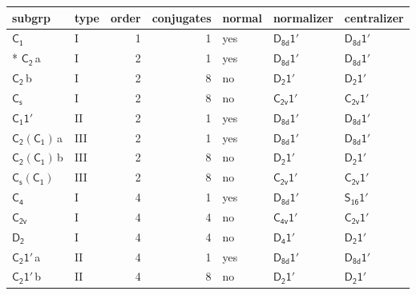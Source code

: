 \documentclass[10pt,a4paper]{article}
\numberwithin{equation}{section}
\newcommand{\grp}[1]{\mathsf{#1}}
\newcommand{\clsletter}[1]{\,{\scriptsize\color{black!55}#1}}
\begin{document}
{\small\begin{longtable}{@{}llrrlll@{}}\toprule
subgrp & type & order & conjugates & normal & normalizer & centralizer\\\midrule\endhead
\bottomrule\endfoot\endlastfoot
\href{../../../rotation/data/pdf/C1.pdf}{$\grp{C_{1}}$} & I & 1 & 1 & yes & \href{D8d-1p.pdf}{$\grp{D_{8d}1'}$} & \href{D8d-1p.pdf}{$\grp{D_{8d}1'}$}\\*
\href{../../../rotation/data/pdf/C2.pdf}{$\grp{C_{2}}$}\clsletter{a} & I & 2 & 1 & yes & \href{D8d-1p.pdf}{$\grp{D_{8d}1'}$} & \href{D8d-1p.pdf}{$\grp{D_{8d}1'}$}\\
\href{../../../rotation/data/pdf/C2.pdf}{$\grp{C_{2}}$}\clsletter{b} & I & 2 & 8 & no & \href{D2-1p.pdf}{$\grp{D_{2}1'}$} & \href{D2-1p.pdf}{$\grp{D_{2}1'}$}\\
\href{../../../rotation/data/pdf/C1v.pdf}{$\grp{C_{s}}$} & I & 2 & 8 & no & \href{C2v-1p.pdf}{$\grp{C_{2v}1'}$} & \href{C2v-1p.pdf}{$\grp{C_{2v}1'}$}\\
\href{C1-1p.pdf}{$\grp{C_{1}1'}$} & II & 2 & 1 & yes & \href{D8d-1p.pdf}{$\grp{D_{8d}1'}$} & \href{D8d-1p.pdf}{$\grp{D_{8d}1'}$}\\
\href{C2-C1.pdf}{$\grp{C_{2}}(\grp{C_{1}})$}\clsletter{a} & III & 2 & 1 & yes & \href{D8d-1p.pdf}{$\grp{D_{8d}1'}$} & \href{D8d-1p.pdf}{$\grp{D_{8d}1'}$}\\
\href{C2-C1.pdf}{$\grp{C_{2}}(\grp{C_{1}})$}\clsletter{b} & III & 2 & 8 & no & \href{D2-1p.pdf}{$\grp{D_{2}1'}$} & \href{D2-1p.pdf}{$\grp{D_{2}1'}$}\\
\href{C1v-C1.pdf}{$\grp{C_{s}}(\grp{C_{1}})$} & III & 2 & 8 & no & \href{C2v-1p.pdf}{$\grp{C_{2v}1'}$} & \href{C2v-1p.pdf}{$\grp{C_{2v}1'}$}\\
\href{../../../rotation/data/pdf/C4.pdf}{$\grp{C_{4}}$} & I & 4 & 1 & yes & \href{D8d-1p.pdf}{$\grp{D_{8d}1'}$} & \href{S16-1p.pdf}{$\grp{S_{16}1'}$}\\
\href{../../../rotation/data/pdf/C2v.pdf}{$\grp{C_{2v}}$} & I & 4 & 4 & no & \href{C4v-1p.pdf}{$\grp{C_{4v}1'}$} & \href{C2v-1p.pdf}{$\grp{C_{2v}1'}$}\\
\href{../../../rotation/data/pdf/D2.pdf}{$\grp{D_{2}}$} & I & 4 & 4 & no & \href{D4-1p.pdf}{$\grp{D_{4}1'}$} & \href{D2-1p.pdf}{$\grp{D_{2}1'}$}\\
\href{C2-1p.pdf}{$\grp{C_{2}1'}$}\clsletter{a} & II & 4 & 1 & yes & \href{D8d-1p.pdf}{$\grp{D_{8d}1'}$} & \href{D8d-1p.pdf}{$\grp{D_{8d}1'}$}\\
\href{C2-1p.pdf}{$\grp{C_{2}1'}$}\clsletter{b} & II & 4 & 8 & no & \href{D2-1p.pdf}{$\grp{D_{2}1'}$} & \href{D2-1p.pdf}{$\grp{D_{2}1'}$}\\

\end{longtable}}
\end{document}
